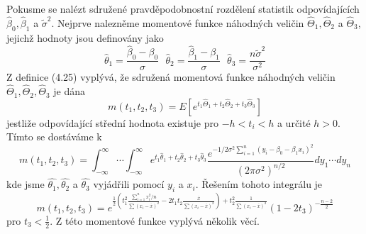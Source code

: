 Pokusme se nalézt sdružené pravděpodobnostní rozdělení statistik odpovídajících $\hat{\beta}_0, \hat{\beta}_1$ a $\tilde{\sigma}^2$. Nejprve nalezněme momentové funkce náhodných veličin $\hat{\Theta}_1, \hat{\Theta}_2$ a $\hat{\Theta}_3$, jejichž hodnoty jsou definovány jako
\begin{equation*}
\hat{\theta}_1 = \frac{\hat{\beta}_0 - \beta_0}{\sigma} ~~~ \hat{\theta}_2 = \frac{\hat{\beta}_1 - \beta_1}{\sigma} ~~~ \hat{\theta}_3 = \frac{n \tilde{\sigma}^2}{\sigma^2}
\end{equation*}
Z definice (4.25) vyplývá, že sdružená momentová funkce náhodných veličin $\hat{\Theta}_1, \hat{\Theta}_2, \hat{\Theta}_3$ je dána
\begin{equation*}
m(t_1, t_2, t_3) = E[e^{t_1 \hat{\Theta}_1 + t_2 \hat{\Theta}_2 + t_3 \hat{\Theta}_3}]
\end{equation*}
jestliže odpovídající střední hodnota existuje pro $-h < t_i < h$ a určité $h > 0$. Tímto se dostáváme k
\begin{equation*}
m(t_1, t_2, t_3) = \int_{-\infty}^{\infty} \cdots  \int_{-\infty}^{\infty} e^{t_1 \hat{\theta}_1 + t_2 \hat{\theta}_2 + t_3 \hat{\theta}_3}\frac{e^{-1/2\sigma^2 \sum_{i = 1}^n (y_i - \beta_0 - \beta_1 x_i)^2}}{(2 \pi \sigma^2)^{n/2}}dy_1 \cdots dy_n
\end{equation*}
kde jsme $\hat{\theta_1}, \hat{\theta_2}$ a $\hat{\theta_3}$ vyjádřili pomocí $y_i$ a $x_i$. Řešením tohoto integrálu je
\begin{equation*}
m(t_1, t_2, t_3) = e^{\frac{1}{2}\left(t_1^2 \frac{\sum_{i = 1}^n x_i^2 / n}{\sum (x_i - \overline{x})^2} - 2 t_1 t_2 \frac{\overline{x}}{\sum (x_i - \overline{x})^2}\right) + t_2^2 \frac{1}{\sum (x_i - \overline{x})^2}}(1 - 2 t_3)^{-\frac{n - 2}{2}} 
\end{equation*}
pro $t_3 < \frac{1}{2}$. Z této momentové funkce vyplývá několik věcí.
